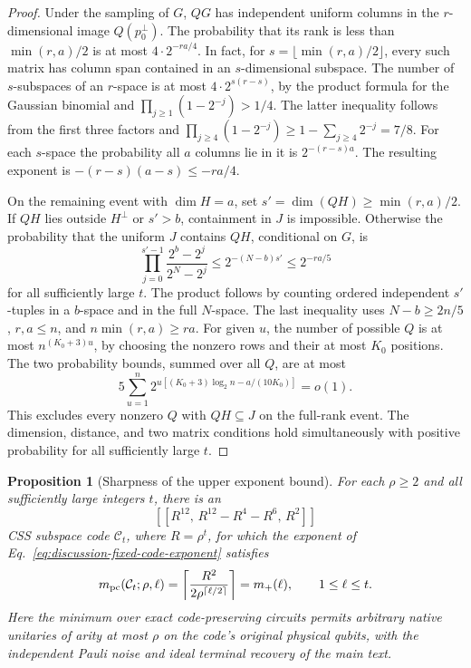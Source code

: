 \documentclass[aps,prl,reprint,notitlepage,nofootinbib,nobibnotes]{revtex4-2}
\newtheorem{proposition}{Proposition}
\begin{document}
\begin{proof}
Under the sampling of \(G\), \(QG\) has independent uniform columns in the \(r\)-dimensional image \(Q(p_0^\perp)\). The probability that its rank is less than \(\min(r,a)/2\) is at most \(4\cdot2^{-ra/4}\). In fact, for \(s=\lfloor\min(r,a)/2\rfloor\), every such matrix has column span contained in an \(s\)-dimensional subspace. The number of \(s\)-subspaces of an \(r\)-space is at most \(4\cdot2^{s(r-s)}\), by the product formula for the Gaussian binomial and \(\prod_{j\ge1}(1-2^{-j})>1/4\). The latter inequality follows from the first three factors and \(\prod_{j\ge4}(1-2^{-j})\ge1-\sum_{j\ge4}2^{-j}=7/8\). For each \(s\)-space the probability all \(a\) columns lie in it is \(2^{-(r-s)a}\). The resulting exponent is \(-(r-s)(a-s)\le-ra/4\).

On the remaining event with \(\dim H=a\), set \(s'=\dim(QH)\ge\min(r,a)/2\). If \(QH\) lies outside \(H^\perp\) or \(s'>b\), containment in \(J\) is impossible. Otherwise the probability that the uniform \(J\) contains \(QH\), conditional on \(G\), is
\[
 \prod_{j=0}^{s'-1}\frac{2^b-2^j}{2^N-2^j}
 \le 2^{-(N-b)s'}
 \le 2^{-ra/5}
\]
for all sufficiently large \(t\). The product follows by counting ordered independent \(s'\)-tuples in a \(b\)-space and in the full \(N\)-space. The last inequality uses \(N-b\ge2n/5\), \(r,a\le n\), and \(n\min(r,a)\ge ra\). For given \(u\), the number of possible \(Q\) is at most \(n^{(K_0+3)u}\), by choosing the nonzero rows and their at most \(K_0\) positions. The two probability bounds, summed over all \(Q\), are at most
\[
 5\sum_{u=1}^n
 2^{u[(K_0+3)\log_2 n-a/(10K_0)]}=o(1).
\]
This excludes every nonzero \(Q\) with \(QH\subseteq J\) on the full-rank event. The dimension, distance, and two matrix conditions hold simultaneously with positive probability for all sufficiently large \(t\).
\end{proof}

\begin{proposition}[Sharpness of the upper exponent bound]
\label{prop:upper-saturation}
For each \(\rho\ge2\) and all sufficiently large integers \(t\), there is an
\[
 [[R^{12},\,R^{12}-R^4-R^6,\,R^2]]
\]
CSS subspace code \(\mathcal C_t\), where \(R=\rho^t\), for which the exponent of Eq.~\eqref{eq:discussion-fixed-code-exponent} satisfies
\begin{equation}\label{em:upper-sharpness}
 m_{\rm pc}(\mathcal C_t;\rho,\ell)
 =\left\lceil\frac{R^2}{2\rho^{\lceil\ell/2\rceil}}\right\rceil
 =m_+(\ell),\qquad 1\le\ell\le t .
\end{equation}
Here the minimum over exact code-preserving circuits permits arbitrary native unitaries of arity at most \(\rho\) on the code's original physical qubits, with the independent Pauli noise and ideal terminal recovery of the main text.
\end{proposition}
\end{document}
